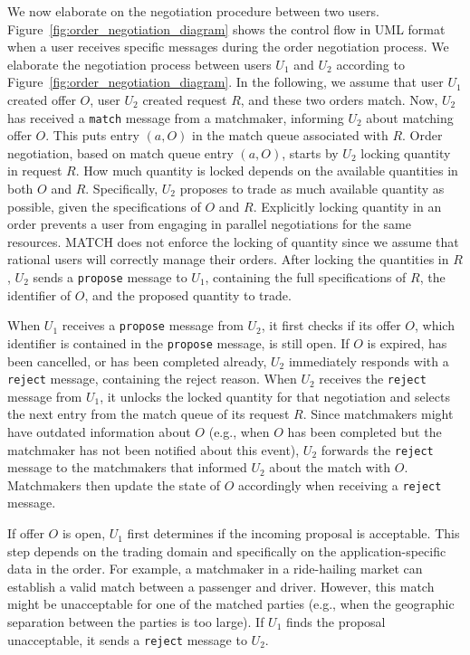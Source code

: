 We now elaborate on the negotiation procedure between two users.
Figure~\ref{fig:order_negotiation_diagram} shows the control flow in UML format when a user receives specific messages during the order negotiation process.
We elaborate the negotiation process between users $ U_1 $ and $ U_2 $ according to Figure~\ref{fig:order_negotiation_diagram}.
In the following, we assume that user $ U_1 $ created offer $ O $, user $ U_2 $ created request $ R $, and these two orders match.
Now, $ U_2 $ has received a \texttt{match} message from a matchmaker, informing $ U_2 $ about matching offer $ O $.
This puts entry $ (a, O) $ in the match queue associated with $ R $.
Order negotiation, based on match queue entry $ (a, O) $, starts by $ U_2 $ locking quantity in request $ R $.
How much quantity is locked depends on the available quantities in both $ O $ and $ R $.
Specifically, $ U_2 $ proposes to trade as much available quantity as possible, given the specifications of $ O $ and $ R $.
Explicitly locking quantity in an order prevents a user from engaging in parallel negotiations for the same resources.
MATCH does not enforce the locking of quantity since we assume that rational users will correctly manage their orders.
After locking the quantities in $ R $, $ U_2 $ sends a \texttt{propose} message to $ U_1 $, containing the full specifications of $ R $, the identifier of $ O $, and the proposed quantity to trade.

When $ U_1 $ receives a \texttt{propose} message from $ U_2 $, it first checks if its offer $ O $, which identifier is contained in the \texttt{propose} message, is still open.
If $ O $ is expired, has been cancelled, or has been completed already, $ U_2 $ immediately responds with a \texttt{reject} message, containing the reject reason.
When $ U_2 $ receives the \texttt{reject} message from $ U_1 $, it unlocks the locked quantity for that negotiation and selects the next entry from the match queue of its request $ R $.
Since matchmakers might have outdated information about $ O $ (e.g., when $ O $ has been completed but the matchmaker has not been notified about this event), $ U_2 $ forwards the \texttt{reject} message to the matchmakers that informed $ U_2 $ about the match with $ O $.
Matchmakers then update the state of $ O $ accordingly when receiving a \texttt{reject} message.

If offer $ O $ is open, $ U_1 $ first determines if the incoming proposal is acceptable.
This step depends on the trading domain and specifically on the application-specific data in the order.
For example, a matchmaker in a ride-hailing market can establish a valid match between a passenger and driver.
However, this match might be unacceptable for one of the matched parties (e.g., when the geographic separation between the parties is too large).
If $ U_1 $ finds the proposal unacceptable, it sends a \texttt{reject} message to $ U_2 $.

